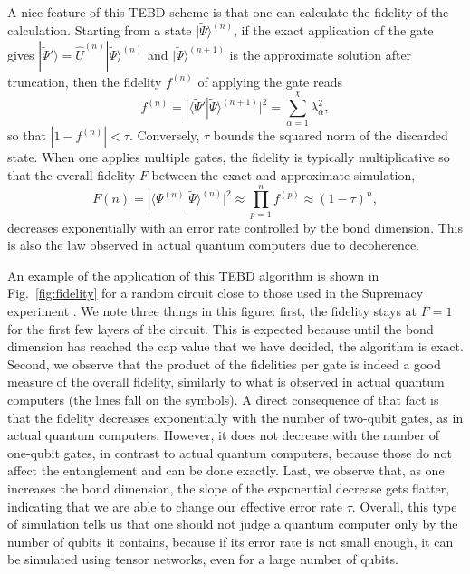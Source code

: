\documentclass{SciPost}
\newcommand{\ket}[1]{|#1\rangle}
\newcommand{\bra}[1]{\langle #1|}
\begin{document}
A nice feature of this TEBD scheme is that one can calculate the fidelity of the calculation. Starting from a state $\ket{\tilde \Psi}^{(n)}$, if the exact application of the gate gives
$\ket{\tilde\Psi'}=\hat U^{(n)} \ket{\tilde\Psi}^{(n)}$ and $\ket{\tilde\Psi}^{(n+1)}$ is the approximate solution after truncation, then the fidelity $f^{(n)}$ of applying the gate reads
\begin{equation}
f^{(n)} = |\bra{\tilde\Psi'} \tilde\Psi\rangle^{(n+1)} |^2
= \sum_{\alpha=1}^{\chi} \lambda_\alpha^2,
\end{equation}
so that $|1-f^{(n)}|<\tau$. Conversely, $\tau$ bounds the squared norm of the discarded state. When one applies multiple gates, the fidelity is typically multiplicative so that the overall fidelity $F$ between the exact and approximate simulation,
\begin{equation}
\label{eq:fid}
F(n) = |\bra{\Psi^{(n)}} \tilde\Psi\rangle^{(n)} |^2 \approx \prod_{p=1}^n f^{(p)}
\approx (1-\tau)^n,
\end{equation}
decreases exponentially with an error rate controlled by the bond dimension. This is also the law observed in actual quantum computers due to decoherence.

An example of the application of this TEBD algorithm is shown in Fig.~\ref{fig:fidelity} for a random circuit close to those used in the Supremacy experiment \cite{arute2019}. We note three things in this figure: first, the fidelity stays at $F=1$ for the first few layers of the circuit. This is expected because until the bond dimension has reached the cap value that we have decided, the algorithm is exact. Second, we observe that the product of the fidelities per gate is indeed a good measure of the overall fidelity, similarly to what is observed in actual quantum computers (the lines fall on the symbols). A direct consequence of that fact is that the fidelity decreases exponentially with the number of two-qubit gates, as in actual quantum computers. However, it does not decrease with the number of one-qubit gates, in contrast to actual quantum computers, because those do not affect the entanglement and can be done exactly. Last, we observe that, as one increases the bond dimension, the slope of the exponential decrease gets flatter, indicating that we are able to change our effective error rate $\tau$. Overall, this type of simulation tells us that one should not judge a quantum computer only by the number of qubits it contains, because if its error rate is not small enough, it can be simulated using tensor networks, even for a large number of qubits.
\end{document}
